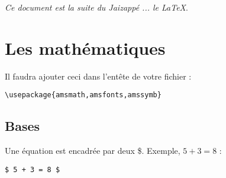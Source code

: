 
\usepackage{chemfig}


\begin{center}
    \emph{Ce document est la suite du Jaizappé ... le \LaTeX}.
\end{center}

\section{Les mathématiques}
    Il faudra ajouter ceci dans l'entête de votre fichier :
    \begin{lstlisting}
\usepackage{amsmath,amsfonts,amssymb}
    \end{lstlisting}
    \subsection{Bases}
        Une équation est encadrée par deux \$. Exemple, $5+3=8$ :
        \begin{lstlisting}
$ 5 + 3 = 8 $
        \end{lstlisting}
